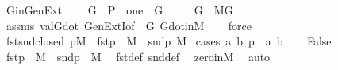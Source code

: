 \begin{isabellebody}
\isanewline
%
\endisadelimproof
\isanewline
\isanewline
{}\isamarkupfalse%
\ G{\isacharunderscore}{\kern0pt}in{\isacharunderscore}{\kern0pt}Gen{\isacharunderscore}{\kern0pt}Ext\ {\isacharcolon}{\kern0pt}\isanewline
\ \ \ {\isachardoublequoteopen}G\ {\isasymsubseteq}\ P{\isachardoublequoteclose}\ \ {\isachardoublequoteopen}one\ {\isasymin}\ G{\isachardoublequoteclose}\isanewline
\ \ \ \ \ {\isachardoublequoteopen}G\ {\isasymin}\ M{\isacharbrackleft}{\kern0pt}G{\isacharbrackright}{\kern0pt}{\isachardoublequoteclose}\isanewline
%
\isadelimproof
\ \ %
\endisadelimproof
%
\isatagproof
{}\isamarkupfalse%
\ assms\ val{\isacharunderscore}{\kern0pt}G{\isacharunderscore}{\kern0pt}dot\ GenExtI{\isacharbrackleft}{\kern0pt}of\ {\isacharunderscore}{\kern0pt}\ G{\isacharbrackright}{\kern0pt}\ G{\isacharunderscore}{\kern0pt}dot{\isacharunderscore}{\kern0pt}in{\isacharunderscore}{\kern0pt}M\isanewline
\ \ \isamarkupfalse%
\ force%
\endisatagproof
{\isafoldproof}%
%
\isadelimproof
\isanewline
%
\endisadelimproof
\isanewline
\isanewline
{}\isamarkupfalse%
\ fst{\isacharunderscore}{\kern0pt}snd{\isacharunderscore}{\kern0pt}closed{\isacharcolon}{\kern0pt}\ {\isachardoublequoteopen}p{\isasymin}M\ {\isasymLongrightarrow}\ fst{\isacharparenleft}{\kern0pt}p{\isacharparenright}{\kern0pt}\ {\isasymin}\ M\ {\isasymand}\ snd{\isacharparenleft}{\kern0pt}p{\isacharparenright}{\kern0pt}{\isasymin}\ M{\isachardoublequoteclose}\isanewline
%
\isadelimproof
%
\endisadelimproof
%
\isatagproof
{}\isamarkupfalse%
\ {\isacharparenleft}{\kern0pt}cases\ {\isachardoublequoteopen}{\isasymexists}a{\isachardot}{\kern0pt}\ {\isasymexists}b{\isachardot}{\kern0pt}\ p\ {\isacharequal}{\kern0pt}\ {\isasymlangle}a{\isacharcomma}{\kern0pt}\ b{\isasymrangle}{\isachardoublequoteclose}{\isacharparenright}{\kern0pt}\isanewline
\ \ \isamarkupfalse%
\ False\isanewline
\ \ \isamarkupfalse%
\isanewline
\ \ \isamarkupfalse%
\ {\isachardoublequoteopen}fst{\isacharparenleft}{\kern0pt}p{\isacharparenright}{\kern0pt}\ {\isasymin}\ M\ {\isasymand}\ snd{\isacharparenleft}{\kern0pt}p{\isacharparenright}{\kern0pt}\ {\isasymin}\ M{\isachardoublequoteclose}\ \isamarkupfalse%
\ fst{\isacharunderscore}{\kern0pt}def\ snd{\isacharunderscore}{\kern0pt}def\ \isamarkupfalse%
\ zero{\isacharunderscore}{\kern0pt}in{\isacharunderscore}{\kern0pt}M\ \isamarkupfalse%
\ auto\isanewline
{}\isamarkupfalse%

\end{isabellebody}
